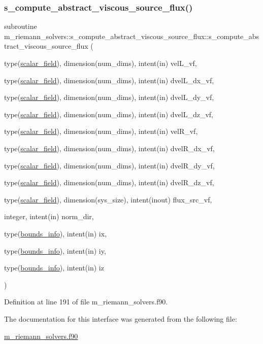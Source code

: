 \subsubsection{\texorpdfstring{s\+\_\+compute\+\_\+abstract\+\_\+viscous\+\_\+source\+\_\+flux()}{s\_compute\_abstract\_viscous\_source\_flux()}}
{\footnotesize\ttfamily subroutine m\+\_\+riemann\+\_\+solvers\+::s\+\_\+compute\+\_\+abstract\+\_\+viscous\+\_\+source\+\_\+flux\+::s\+\_\+compute\+\_\+abstract\+\_\+viscous\+\_\+source\+\_\+flux (\begin{DoxyParamCaption}\item[{type(\hyperlink{structm__derived__types_1_1scalar__field}{scalar\+\_\+field}), dimension(num\+\_\+dims), intent(in)}]{vel\+L\+\_\+vf,  }\item[{type(\hyperlink{structm__derived__types_1_1scalar__field}{scalar\+\_\+field}), dimension(num\+\_\+dims), intent(in)}]{dvel\+L\+\_\+dx\+\_\+vf,  }\item[{type(\hyperlink{structm__derived__types_1_1scalar__field}{scalar\+\_\+field}), dimension(num\+\_\+dims), intent(in)}]{dvel\+L\+\_\+dy\+\_\+vf,  }\item[{type(\hyperlink{structm__derived__types_1_1scalar__field}{scalar\+\_\+field}), dimension(num\+\_\+dims), intent(in)}]{dvel\+L\+\_\+dz\+\_\+vf,  }\item[{type(\hyperlink{structm__derived__types_1_1scalar__field}{scalar\+\_\+field}), dimension(num\+\_\+dims), intent(in)}]{vel\+R\+\_\+vf,  }\item[{type(\hyperlink{structm__derived__types_1_1scalar__field}{scalar\+\_\+field}), dimension(num\+\_\+dims), intent(in)}]{dvel\+R\+\_\+dx\+\_\+vf,  }\item[{type(\hyperlink{structm__derived__types_1_1scalar__field}{scalar\+\_\+field}), dimension(num\+\_\+dims), intent(in)}]{dvel\+R\+\_\+dy\+\_\+vf,  }\item[{type(\hyperlink{structm__derived__types_1_1scalar__field}{scalar\+\_\+field}), dimension(num\+\_\+dims), intent(in)}]{dvel\+R\+\_\+dz\+\_\+vf,  }\item[{type(\hyperlink{structm__derived__types_1_1scalar__field}{scalar\+\_\+field}), dimension(sys\+\_\+size), intent(inout)}]{flux\+\_\+src\+\_\+vf,  }\item[{integer, intent(in)}]{norm\+\_\+dir,  }\item[{type(\hyperlink{structm__derived__types_1_1bounds__info}{bounds\+\_\+info}), intent(in)}]{ix,  }\item[{type(\hyperlink{structm__derived__types_1_1bounds__info}{bounds\+\_\+info}), intent(in)}]{iy,  }\item[{type(\hyperlink{structm__derived__types_1_1bounds__info}{bounds\+\_\+info}), intent(in)}]{iz }\end{DoxyParamCaption})}



Definition at line 191 of file m\+\_\+riemann\+\_\+solvers.\+f90.



The documentation for this interface was generated from the following file\+:\begin{DoxyCompactItemize}
\item 
\hyperlink{m__riemann__solvers_8f90}{m\+\_\+riemann\+\_\+solvers.\+f90}\end{DoxyCompactItemize}
